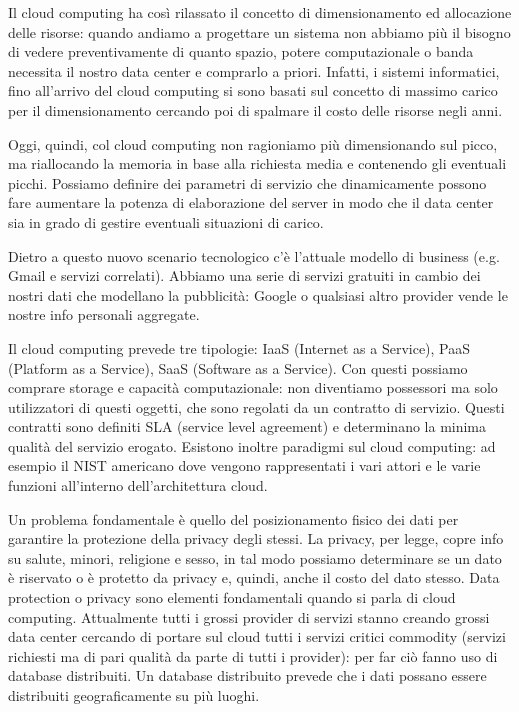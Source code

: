 Il cloud computing ha così rilassato il concetto di dimensionamento ed allocazione delle risorse: quando andiamo a progettare un sistema non abbiamo più il bisogno di vedere preventivamente di quanto spazio, potere computazionale o banda necessita il nostro data center e comprarlo a priori. Infatti, i sistemi informatici, fino all’arrivo del cloud computing si sono basati sul concetto di massimo carico per il dimensionamento cercando poi di spalmare il costo delle risorse negli anni.  

Oggi, quindi, col cloud computing non ragioniamo più dimensionando sul picco, ma riallocando  la memoria in base alla richiesta media e contenendo gli eventuali picchi. Possiamo definire  dei parametri di servizio che dinamicamente possono fare aumentare la potenza di elaborazione  del server in modo che il data center sia in grado di gestire eventuali situazioni di carico. 

Dietro a questo nuovo scenario tecnologico c’è l’attuale modello di business (e.g. Gmail e servizi correlati). Abbiamo una serie di servizi gratuiti in cambio dei nostri dati che modellano la pubblicità: Google o qualsiasi altro provider vende le nostre info personali aggregate. 

Il cloud computing prevede tre tipologie: IaaS (Internet as a Service), PaaS (Platform as a Service), SaaS (Software as a Service). Con questi possiamo comprare storage e capacità computazionale:  non diventiamo possessori ma solo utilizzatori di questi oggetti, che sono regolati da un contratto di servizio. Questi contratti sono definiti SLA (service level agreement) e determinano la minima qualità del servizio erogato. Esistono inoltre paradigmi sul cloud computing: ad esempio il NIST americano dove vengono rappresentati i vari attori e le varie funzioni all’interno dell’architettura cloud. 

Un problema fondamentale è quello del posizionamento fisico dei dati per garantire la protezione della privacy degli stessi. La privacy, per legge, copre info su salute, minori, religione e sesso,  in tal modo possiamo determinare se un dato è riservato o è protetto da privacy e, quindi, anche il costo del dato stesso. Data protection o privacy sono elementi fondamentali quando si parla di cloud computing. 
Attualmente tutti i grossi provider di servizi stanno creando grossi data center cercando di portare sul cloud tutti i servizi critici commodity (servizi richiesti ma di pari qualità da parte di tutti  
i provider): per far ciò fanno uso di database distribuiti. Un database distribuito prevede che  i dati possano essere distribuiti geograficamente su più luoghi.  

